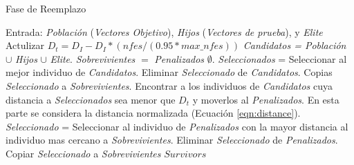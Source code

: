 \begin{algorithm}[t]
  \scriptsize
	\caption{Fase de Reemplazo} \label{alg:Replacement}
	\begin{algorithmic}[1]
	\STATE Entrada: \textit{Población} (\textit{Vectores Objetivo}), \textit{Hijos} (\textit{Vectores de prueba}), y \textit{Elite}
	\STATE Actulizar $D_t = D_I - D_I *(nfes/(0.95*max\_nfes)) $ 
	\STATE \textit{Candidatos = Población} $\cup$ \textit{Hijos} $\cup$ \textit{Elite}.
	\STATE \textit{Sobrevivientes} $=$ \textit{Penalizados} $\emptyset$.
	   \STATE \textit{Seleccionados} = Seleccionar al mejor individuo de \textit{Candidatos}.
		 \STATE Eliminar \textit{Seleccionado} de \textit{Candidatos}.
	   \STATE Copias \textit{Seleccionado} a \textit{Sobrevivientes}.
	   \STATE Encontrar a los individuos de \textit{Candidatos} cuya distancia a \textit{Seleccionados} sea menor que $D_t$ y moverlos al \textit{Penalizados}. En esta parte se considera la distancia normalizada (Ecuación \ref{eqn:distance}).
	\ENDWHILE
	   \STATE \textit{Seleccionado} = Seleccionar al individuo de \textit{Penalizados} con la mayor distancia al individuo mas cercano a \textit{Sobrevivientes}.
		 \STATE Eliminar \textit{Seleccionado} de \textit{Penalizados}.
	   \STATE Copiar \textit{Seleccionado} a \textit{Sobrevivientes}
	\ENDWHILE
  \RETURN $Survivors$
\end{algorithmic}
\end{algorithm}

